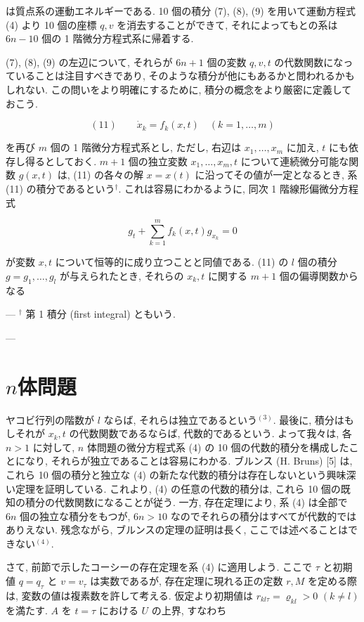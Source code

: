 \documentclass[dvipdfmx, leqno]{jsbook}
\begin{document}
は質点系の運動エネルギーである. 10 個の積分 (7), (8), (9) を用いて運動方程式 (4) より 10 個の座標 $q, v$ を消去することができて, それによってもとの系は $6n - 10$ 個の 1 階微分方程式系に帰着する.

(7), (8), (9) の左辺について, それらが $6n + 1$ 個の変数 $q, v, t$ の代数関数になっていることは注目すべきであり, そのような積分が他にもあるかと問われるかもしれない. この問いをより明確にするために, 積分の概念をより厳密に定義しておこう.

$$(11) \qquad \dot{x}_k = f_k(x, t) \quad (k=1,\dots,m)$$

を再び $m$ 個の 1 階微分方程式系とし, ただし, 右辺は $x_1, \dots, x_m$ に加え, $t$ にも依存し得るとしておく. $m + 1$ 個の独立変数 $x_1, \dots, x_m, t$ について連続微分可能な関数 $g(x, t)$ は, (11) の各々の解 $x = x(t)$ に沿ってその値が一定となるとき, 系 (11) の積分であるという$^\dagger$. これは容易にわかるように, 同次 1 階線形偏微分方程式

$$g_t + \sum_{k=1}^{m} f_k(x, t) g_{x_k} = 0$$

が変数 $x, t$ について恒等的に成り立つことと同値である. (11) の $l$ 個の積分 $g = g_1, \dots, g_l$ が与えられたとき, それらの $x_k, t$ に関する $m + 1$ 個の偏導関数からなる

---
$^\dagger$ 第 1 積分 (first integral) ともいう.

---

\section{$n$体問題}

ヤコビ行列の階数が $l$ ならば, それらは独立であるという$^{(3)}$. 最後に, 積分はもしそれが $x_k, t$ の代数関数であるならば, 代数的であるという. よって我々は, 各 $n > 1$ に対して, $n$ 体問題の微分方程式系 (4) の 10 個の代数的積分を構成したことになり, それらが独立であることは容易にわかる. ブルンス (H. Bruns) [5] は, これら 10 個の積分と独立な (4) の新たな代数的積分は存在しないという興味深い定理を証明している. これより, (4) の任意の代数的積分は, これら 10 個の既知の積分の代数関数になることが従う. 一方, 存在定理により, 系 (4) は全部で $6n$ 個の独立な積分をもつが, $6n > 10$ なのでそれらの積分はすべてが代数的ではありえない. 残念ながら, ブルンスの定理の証明は長く, ここでは述べることはできない$^{(4)}$.

さて, 前節で示したコーシーの存在定理を系 (4) に適用しよう. ここで $\tau$ と初期値 $q = q_\tau$ と $v = v_\tau$ は実数であるが, 存在定理に現れる正の定数 $r, M$ を定める際は, 変数の値は複素数を許して考える. 仮定より初期値は $r_{kl\tau} = \varrho_{kl} > 0$ $(k \neq l)$ を満たす. $A$ を $t = \tau$ における $U$ の上界, すなわち
\end{document}
